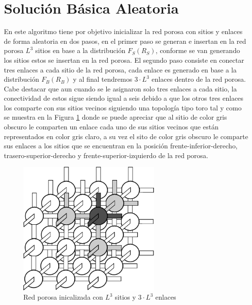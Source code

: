 \section{Solución Básica Aleatoria}
\label{sec:smcrg}
En este algoritmo tiene por objetivo inicializar la red porosa con sitios y enlaces de forma aleatoria en dos pasos, en el primer paso se generan e insertan en la red porosa $L^3$ sitios en base a la distribución $F_S(R_S)$, conforme se van generando los sitios estos se insertan en la red porosa. El segundo paso consiste en conectar tres enlaces a cada sitio de la red porosa, cada enlace es generado en base a la distribución $F_B(R_B)$ y al final tendremos $3 \cdot L^3$ enlaces dentro de la red porosa.\\

Cabe destacar que aun cuando se le asignaron solo tres enlaces a cada sitio, la conectividad de estos sigue siendo igual a seis debido a que los otros tres enlaces los comparte con sus sitios vecinos siguiendo una topología tipo toro tal y como se muestra en la Figura \ref{fig:redinit} donde se puede apreciar que al sitio de color gris obscuro le comparten un enlace cada uno de sus sitios vecinos que están representados en color gris claro, a su vez el sito de color gris obscuro le comparte sus enlaces a los sitios que se encuentran en la posición frente-inferior-derecho, trasero-superior-derecho y frente-superior-izquierdo de la red porosa.


\begin{figure}[hbtp]
\centering
\includegraphics[width=2.8in]{img/red2.pdf}
\caption{Red porosa inicalizada con $L^3$ sitios y $3 \cdot L^3$ enlaces}
\label{fig:redinit}
\end{figure}

